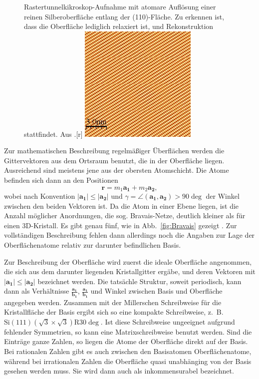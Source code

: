 \begin{figure}[!t]
  \begin{captionbeside}[]{Rastertunnelkikroskop-Aufnahme mit atomare Auflösung einer reinen 
Silberoberfläche entlang der (110)-Fläche. Zu erkennen ist, dass die Oberfläche 
lediglich relaxiert ist, und Rekonstruktion stattfindet. 
Aus \cite{kahn:stm_images}.}[r]
    \includegraphics[width=0.5\textwidth]{pics/Ag(110)_clean}
  \end{captionbeside}
  \label{fig:Ag(110)}
\end{figure}

Zur mathematischen Beschreibung regelmäßiger Überflächen werden die Gittervektoren 
aus dem Ortsraum benutzt, die in der Oberfläche liegen. Ausreichend sind meistens 
jene aus der obersten Atomschicht. Die Atome befinden sich dann an den Positionen 
\begin{equation}
    \mathbf{r} = m_1 \mathbf{a_1} + m_2 \mathbf{a_2},
\end{equation}
wobei nach Konvention $|\mathbf{a_1}| \le |\mathbf{a_2}|$ und 
$\gamma = \angle (\mathbf{a_1}, \mathbf{a_2}) > 90 \deg$ der Winkel zwischen den 
beiden Vektoren ist. Da die Atom in einer Ebene liegen, ist die Anzahl möglicher 
Anordnungen, die sog. Bravais-Netze, deutlich kleiner als für einen 3D-Kristall. 
Es gibt genau fünf, wie in Abb.~\ref{fig:Bravais} gezeigt 
\cite{henzler1991oberflachenphysik}.
Zur vollständigen Beschreibung fehlen dann allerdings noch die Angaben zur Lage 
der Oberflächenatome relativ zur darunter befindlichen Basis. 

Zur Beschreibung der Oberfläche wird zuerst die ideale Oberfläche angenommen, 
die sich aus dem darunter liegenden Kristallgitter ergäbe, und deren Vektoren mit
$|\mathbf{a_1}| \le |\mathbf{a_2}|$ bezeichnet werden. Die tatsächle Struktur, 
soweit periodisch, kann dann als Verhältnisse $\frac{\mathbf{a_1}}{\mathbf{b_1}}$, 
$\frac{\mathbf{a_1}}{\mathbf{b_1}}$ und Winkel zwischen Basis und Oberfläche angegeben 
werden. Zusammen mit der Millerschen Schreibweise für die Kristallfläche der Basis 
ergibt sich so eine kompakte Schreibweise, z.~B. 
$\mathrm{Si}(111)(\sqrt{3} \times \sqrt{3}) \mathrm{R} 30 \deg$. 
Ist diese Schreibweise ungeeignet aufgrund fehlender Symmetrien, so kann eine 
Matrixschreibweise benutzt werden. Sind die Einträge ganze Zahlen, so liegen die 
Atome der Oberfläche direkt auf der Basis. Bei rationalen Zahlen gibt es auch 
zwischen den Basisatomen Oberflächenatome, während bei irrationalen Zahlen die 
Oberfläche quasi unabhänging von der Basis gesehen werden muss. Sie wird dann auch 
als inkommensurabel bezeichnet\cite{henzler1991oberflachenphysik}.

